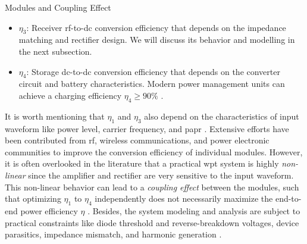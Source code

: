 \begin{section}{}
\begin{subsection}{Modules and Coupling Effect}
\begin{itemize}
			\item $\eta_3$: Receiver \gls{rf}-to-\gls{dc} conversion efficiency that depends on the impedance matching and rectifier design. We will discuss its behavior and modelling in the next subsection.
			\item $\eta_4$: Storage \gls{dc}-to-\gls{dc} conversion efficiency that depends on the converter circuit and battery characteristics. Modern power management units can achieve a charging efficiency $\eta_4 \ge 90\%$ \cite{Tan2012}.
		\end{itemize}
		It is worth mentioning that $\eta_1$ and $\eta_3$ also depend on the characteristics of input waveform like power level, carrier frequency, and \gls{papr} \cite{Clerckx2016a}.
		Extensive efforts have been contributed from \gls{rf}, wireless communications, and power electronic communities to improve the conversion efficiency of individual modules.
		However, it is often overlooked in the literature that a practical \gls{wpt} system is highly \emph{non-linear} since the amplifier and rectifier are very sensitive to the input waveform.
		This non-linear behavior can lead to a \emph{coupling effect} between the modules, such that optimizing $\eta_1$ to $\eta_4$ independently does not necessarily maximize the end-to-end power efficiency $\eta$ \cite{Clerckx2016a}.
		Besides, the system modeling and analysis are subject to practical constraints like diode threshold and reverse-breakdown voltages, device parasitics, impedance mismatch, and harmonic generation  \citep{Valenta2014}.
	\end{subsection}


\end{section}

